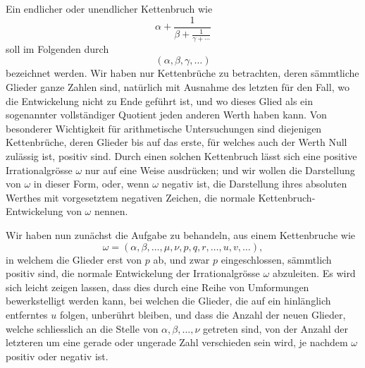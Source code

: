 \documentclass[11pt]{article}
\begin{document}
Ein endlicher oder unendlicher Kettenbruch wie
\[
  \alpha+\frac{1}{\beta+\frac{1}{\gamma+\cdots}}
\]
soll im Folgenden durch
\[
  (\alpha,\beta,\gamma,\ldots)
\]
bezeichnet werden. Wir haben nur Kettenbrüche zu betrachten, deren sämmtliche Glieder ganze Zahlen sind, natürlich mit Ausnahme des letzten für den Fall, wo die Entwickelung nicht zu Ende geführt ist, und wo dieses Glied als ein sogenannter vollständiger Quotient jeden anderen Werth haben kann. Von besonderer Wichtigkeit für arithmetische Untersuchungen sind diejenigen Kettenbrüche, deren Glieder bis auf das erste, für welches auch der Werth Null zulässig ist, positiv sind. Durch einen solchen Kettenbruch lässt sich eine positive Irrationalgrösse $\omega$ nur auf eine Weise ausdrücken; und wir wollen die Darstellung von $\omega$ in dieser Form, oder, wenn $\omega$ negativ ist, die Darstellung ihres absoluten Werthes mit vorgesetztem negativen Zeichen, die normale Kettenbruch-Entwickelung von $\omega$ nennen.

Wir haben nun zunächst die Aufgabe zu behandeln, aus einem Kettenbruche wie
\[
  \omega=(\alpha,\beta,\ldots,\mu,\nu,p,q,r,\ldots,u,v,\ldots),
\]
in welchem die Glieder erst von $p$ ab, und zwar $p$ eingeschlossen, sämmtlich positiv sind, die normale Entwickelung der Irrationalgrösse $\omega$ abzuleiten. Es wird sich leicht zeigen lassen, dass dies durch eine Reihe von Umformungen bewerkstelligt werden kann, bei welchen die Glieder, die auf ein hinlänglich entferntes $u$ folgen, unberührt bleiben, und dass die Anzahl der neuen Glieder, welche schliesslich an die Stelle von $\alpha,\beta,\ldots,\nu$ getreten sind, von der Anzahl der letzteren um eine gerade oder ungerade Zahl verschieden sein wird, je nachdem $\omega$ positiv oder negativ ist.
\end{document}

